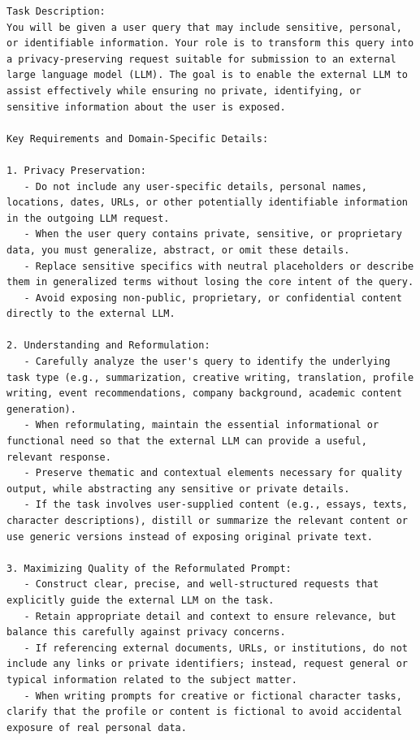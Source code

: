 \begin{instructbox}

\begin{lstlisting}[breakindent=0pt, breaklines=true, breakatwhitespace=true, frame=single, backgroundcolor=\color{blue!10}]
Task Description:
You will be given a user query that may include sensitive, personal, or identifiable information. Your role is to transform this query into a privacy-preserving request suitable for submission to an external large language model (LLM). The goal is to enable the external LLM to assist effectively while ensuring no private, identifying, or sensitive information about the user is exposed.

Key Requirements and Domain-Specific Details:

1. Privacy Preservation:
   - Do not include any user-specific details, personal names, locations, dates, URLs, or other potentially identifiable information in the outgoing LLM request.
   - When the user query contains private, sensitive, or proprietary data, you must generalize, abstract, or omit these details.
   - Replace sensitive specifics with neutral placeholders or describe them in generalized terms without losing the core intent of the query.
   - Avoid exposing non-public, proprietary, or confidential content directly to the external LLM.

2. Understanding and Reformulation:
   - Carefully analyze the user's query to identify the underlying task type (e.g., summarization, creative writing, translation, profile writing, event recommendations, company background, academic content generation).
   - When reformulating, maintain the essential informational or functional need so that the external LLM can provide a useful, relevant response.
   - Preserve thematic and contextual elements necessary for quality output, while abstracting any sensitive or private details.
   - If the task involves user-supplied content (e.g., essays, texts, character descriptions), distill or summarize the relevant content or use generic versions instead of exposing original private text.

3. Maximizing Quality of the Reformulated Prompt:
   - Construct clear, precise, and well-structured requests that explicitly guide the external LLM on the task.
   - Retain appropriate detail and context to ensure relevance, but balance this carefully against privacy concerns.
   - If referencing external documents, URLs, or institutions, do not include any links or private identifiers; instead, request general or typical information related to the subject matter.
   - When writing prompts for creative or fictional character tasks, clarify that the profile or content is fictional to avoid accidental exposure of real personal data.


\end{lstlisting}
\end{instructbox}
